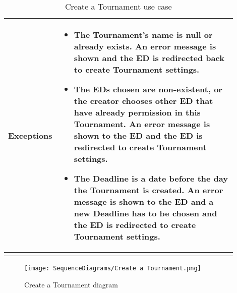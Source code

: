 \begin{center}
\begin{longtable}{|l|p{0.9\linewidth}|}
        \hline
        \textbf{Exceptions}        & \begin{itemize}
            \item The Tournament’s name is null or already exists. An error message is shown and the ED is redirected back to create Tournament settings.
            \item The EDs chosen are non-existent, or the creator chooses other ED that have already permission in this Tournament. An error message is shown to the ED and the ED is redirected to create Tournament settings.
            \item The Deadline is a date before the day the Tournament is created. An error message is shown to the ED and a new Deadline has to be chosen and the ED  is redirected to create Tournament settings.
         \end{itemize}    \\
        \hline
        \caption{Create a Tournament use case}
        \label{tab: create_a_Tournament_use_case}
    \end{longtable}
\end{center}

\begin{figure}[H]
    \begin{center}
        \texttt{[image: SequenceDiagrams/Create a Tournament.png]}
        \caption{Create a Tournament diagram}
        \label{fig:create_a_Tournament_seqd}%
    \end{center}
\end{figure}

